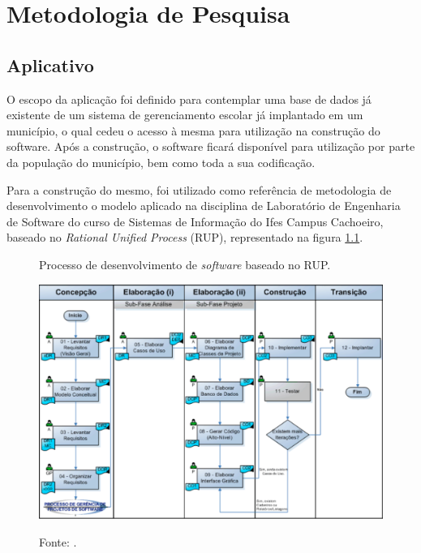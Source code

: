 \chapter{\textbf{Metodologia de Pesquisa}} %
\sloppy %

\section{Aplicativo}

O escopo da aplicação foi definido para contemplar uma base de dados já existente de um sistema de gerenciamento escolar já implantado em um município, o qual cedeu o acesso à mesma para utilização na construção do software. Após a construção, o software ficará disponível para utilização por parte da população do município, bem como toda a sua codificação.

Para a construção do mesmo, foi utilizado como referência de metodologia de desenvolvimento o modelo aplicado na disciplina de Laboratório de Engenharia de Software do curso de Sistemas de Informação do Ifes Campus Cachoeiro, baseado no \textit{Rational Unified Process} (RUP), representado na figura \ref{figura:rup}. 

\begin{figure}[H]
	\caption{Processo de desenvolvimento de \textit{software} baseado no RUP.}
	\centering %
	\includegraphics[width=16cm]{resources/pds_rup.png} %
	\label{figura:rup}
	\captionsetup{singlelinecheck = false, format= hang, justification=raggedright, labelsep=space, width=16cm}
	\caption*{\footnotesize Fonte: .}
\end{figure}

